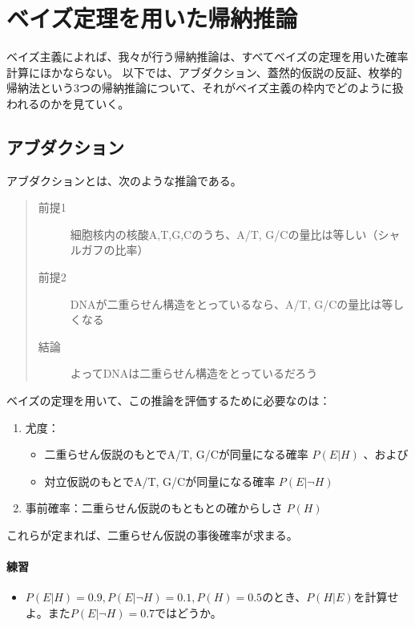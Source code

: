 \documentclass{jsarticle}
\begin{document}
\section{ベイズ定理を用いた帰納推論}
ベイズ主義によれば、我々が行う帰納推論は、すべてベイズの定理を用いた確率計算にほかならない。
以下では、アブダクション、蓋然的仮説の反証、枚挙的帰納法という3つの帰納推論について、それがベイズ主義の枠内でどのように扱われるのかを見ていく。

\subsection{アブダクション}
アブダクションとは、次のような推論である。
\begin{quote}
 \begin{description}
 \item[前提1] 細胞核内の核酸A,T,G,Cのうち、A/T, G/Cの量比は等しい（シャルガフの比率）
 \item[前提2] DNAが二重らせん構造をとっているなら、A/T, G/Cの量比は等しくなる
 \item[結論 ] よってDNAは二重らせん構造をとっているだろう
 \end{description}
\end{quote}

ベイズの定理を用いて、この推論を評価するために必要なのは：
\begin{enumerate}
 \item 尤度：
       \begin{itemize}
	\item 二重らせん仮説のもとでA/T, G/Cが同量になる確率 $P(E|H)$ 、および
        \item 対立仮説のもとでA/T, G/Cが同量になる確率 $P(E|\neg H)$
       \end{itemize}
 \item 事前確率：二重らせん仮説のもともとの確からしさ $P(H)$
\end{enumerate}
これらが定まれば、二重らせん仮説の事後確率が求まる。

\paragraph{練習}
\begin{itemize}
 \item $P(E|H)=0.9, P(E|\neg H)=0.1, P(H)=0.5$のとき、$P(H|E)$を計算せよ。また$P(E|\neg H)=0.7$ではどうか。
\end{itemize}
\end{document}
